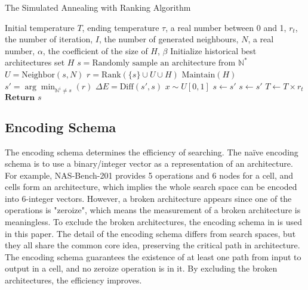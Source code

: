\documentclass[sigconf]{acmart}
\begin{document}
    \begin{algorithm}[h]
        \caption{The Simulated Annealing with Ranking Algorithm}\label{alg:SA}
        \begin{algorithmic}[1]
            \Parameter Initial temperature $T$, ending temperature $\tau$, a real number between 0 and 1, $r_t$, the number of iteration, $I$, the number of generated neighbours, $N$, a real number, $\alpha$, the coefficient of the size of $H$, $\beta$
            \State Initialize historical best architectures set $H$
            \State $s=\text{Randomly sample an architecture from }\mathbb N^*$
                    \State $U = \text{Neighbor}(s, N)$
                    \State $r=\text{Rank}(\{s\}\cup U\cup H)$
                    \State $\text{Maintain}(H)$
                    \State $s'=\arg\min_{\mathbb N^i\neq s}(r)$
                    \State $\Delta E=\text{Diff}(s', s)$
                    \State $x\sim U[0,1]$
                        \State $s\leftarrow s'$
                            \State $s\leftarrow s'$
                    \EndIf
                \EndFor
                \State $T\leftarrow T\times r_t$
            \EndWhile
            \State $\textbf{Return }s$ 
        \end{algorithmic}
    \end{algorithm}

    \subsection{Encoding Schema}

    The encoding schema determines the efficiency of searching. The naïve encoding 
    schema is to use a binary/integer vector as a representation of an architecture. 
    For example, NAS-Bench-201 provides 5 operations and 6 nodes for a cell, 
    and cells form an architecture, which implies the whole search space can be 
    encoded into 6-integer vectors. However, a broken architecture appears since 
    one of the operations is "zeroize", which means the measurement of a broken 
    architecture is meaningless. To exclude the broken architectures, the encoding 
    schema in \cite{10092788} is used in this paper. The detail of the encoding 
    schema differs from search spaces, but they all share the common core idea, 
    preserving the critical path in architecture. The encoding schema guarantees 
    the existence of at least one path from input to output in a cell, and no 
    zeroize operation is in it. By excluding the broken architectures, the efficiency 
    improves. 
\end{document}
